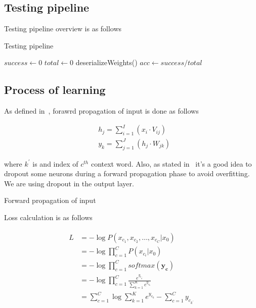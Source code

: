 \documentclass{article}
\newcommand{\SetAlgoStyle}{
	\SetAlgoNoLine
	\SetAlgoNoEnd
	\DontPrintSemicolon
}
\begin{document}
\subsection{Testing pipeline}

Testing pipeline overview is as follows

\begin{algorithm}[H]
	\caption{Testing pipeline}
	\SetAlgoStyle
	$success \gets 0$\;
	$total \gets 0$\;
	deserializeWeights()\;
	$acc \gets success / total$\;
\end{algorithm}

\subsection{Process of learning}

As defined in~\cite{1411.2738}, forawrd propagation of input is done as follows

\begin{align}
	&h_j = \sum_{i=1}^I (x_i \cdot V_{ij}) \\
	&y_k = \sum_{j=1}^J (h_j \cdot W_{jk})
\end{align}

where $k^\prime$ is and index of $c^{th}$ context word. Also, as stated
in~\cite{1512.05287} it's a good idea to dropout some neurons during a forward
propagation phase to avoid overfitting. We are using dropout in the output layer.

\begin{algorithm}[H]
	\caption{Forward propagation of input}
	\SetAlgoStyle
\end{algorithm}

Loss calculation is as follows

\begin{align}
	\begin{aligned}
		L &= -\log P(x_{c_1}, x_{c_2},\ldots,x_{c_C}|x_0) \\
		&= -\log \prod_{c=1}^C P(x_{c_i}|x_0) \\
		&= -\log \prod_{c=1}^C softmax(\boldsymbol{y_c}) \\
		&= -\log \prod_{c=1}^C \frac{e^{y_{c_{k^\prime}}}}{\sum_{k=1}^K
		e^{y_{c_k}}} \\
		&= \sum_{c=1}^C \log\sum_{k=1}^K e^{y_{c_k}} - \sum_{c=1}^C
		y_{c_{k^\prime}}
	\end{aligned}
\end{align}
\end{document}
